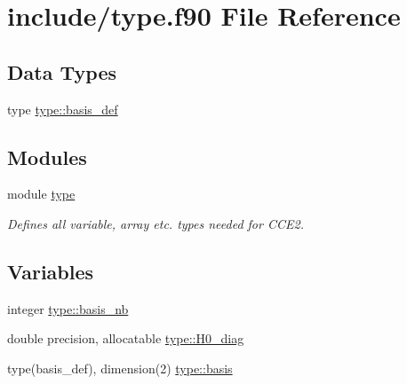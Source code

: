 \hypertarget{type_8f90}{
\section{include/type.f90 File Reference}
\label{type_8f90}
}
\subsection*{Data Types}
\begin{DoxyCompactItemize}
\item 
type \hyperlink{typetype_1_1basis__def}{type::basis\_\-def}
\end{DoxyCompactItemize}
\subsection*{Modules}
\begin{DoxyCompactItemize}
\item 
module \hyperlink{namespacetype}{type}


\begin{DoxyCompactList}\small\item\em Defines all variable, array etc. types needed for CCE2. \item\end{DoxyCompactList}\end{DoxyCompactItemize}
\subsection*{Variables}
\begin{DoxyCompactItemize}
\item 
integer \hyperlink{namespacetype_a8147b0e65a57c1e13f37406eb567974c}{type::basis\_\-nb}
\item 
double precision, allocatable \hyperlink{namespacetype_a5059bb126df0403fee858f273ff2393d}{type::H0\_\-diag}
\item 
type(basis\_\-def), dimension(2) \hyperlink{namespacetype_a398941ef8f9eeb6255ff44e9ba5d23b1}{type::basis}
\end{DoxyCompactItemize}
